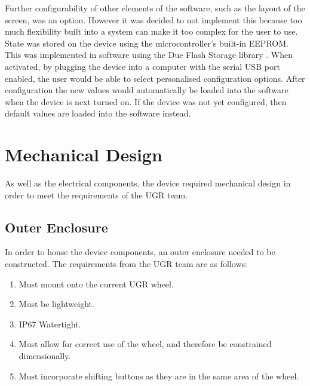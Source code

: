 \documentclass[a4paper,12pt]{article}
\begin{document}
Further configurability of other elements of the software, such as the layout of the screen, was an option. However it was decided to not implement this because too much flexibility built into a system can make it too complex for the user to use. \\



State was stored on the device using the microcontroller's built-in EEPROM. This was implemented in software using the Due Flash Storage library \cite{due_flash_storage}. When activated, by plugging the device into a computer with the serial USB port enabled, the user would be able to select personalised configuration options. After configuration the new values would automatically be loaded into the software when the device is next turned on. If the device was not yet configured, then default values are loaded into the software instead.


\newpage
\section{Mechanical Design}
\label{sec:mechanical_design}

As well as the electrical components, the device required mechanical design in order to meet the requirements of the UGR team.

\subsection{Outer Enclosure}
\label{sec:outer_enclosure}

In order to house the device components, an outer enclosure needed to be constructed. The requirements from the UGR team are as follows:

\begin{enumerate}
  \item Must mount onto the current UGR wheel.
  \item Must be lightweight.
  \item IP67 Watertight.
  \item Must allow for correct use of the wheel, and therefore be constrained dimensionally.
  \item Must incorporate shifting buttons as they are in the same area of the wheel.
\end{enumerate}
\end{document}
